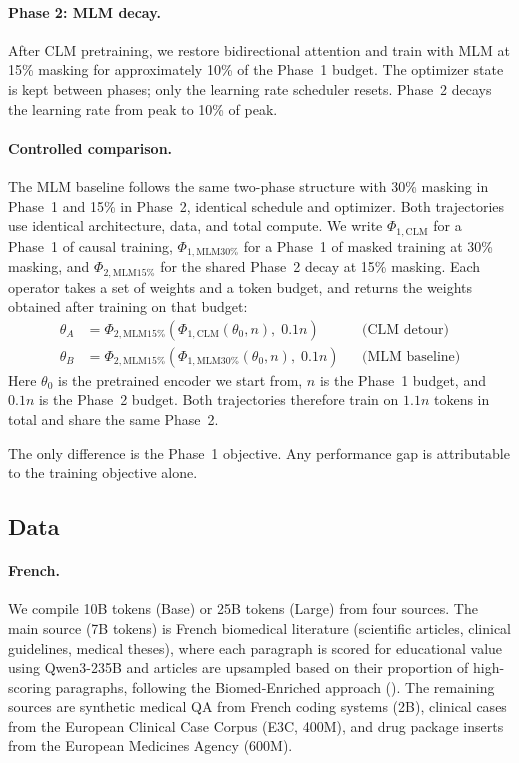 \paragraph{Phase 2: MLM decay.} After CLM pretraining, we restore bidirectional attention and train with MLM at 15\% masking for approximately 10\% of the Phase~1 budget. The optimizer state is kept between phases; only the learning rate scheduler resets. Phase~2 decays the learning rate from peak to 10\% of peak.

\paragraph{Controlled comparison.} The MLM baseline follows the same two-phase structure with 30\% masking in Phase~1 and 15\% in Phase~2, identical schedule and optimizer. Both trajectories use identical architecture, data, and total compute. We write $\Phi_{1,\text{CLM}}$ for a Phase~1 of causal training, $\Phi_{1,\text{MLM}30\%}$ for a Phase~1 of masked training at 30\% masking, and $\Phi_{2,\text{MLM}15\%}$ for the shared Phase~2 decay at 15\% masking. Each operator takes a set of weights and a token budget, and returns the weights obtained after training on that budget:
\begin{align*}
\theta_A &= \Phi_{2,\text{MLM}15\%}(\Phi_{1,\text{CLM}}(\theta_0, n),\; 0.1n) && \text{(CLM detour)} \\
\theta_B &= \Phi_{2,\text{MLM}15\%}(\Phi_{1,\text{MLM}30\%}(\theta_0, n),\; 0.1n) && \text{(MLM baseline)}
\end{align*}
Here $\theta_0$ is the pretrained encoder we start from, $n$ is the Phase~1 budget, and $0.1n$ is the Phase~2 budget. Both trajectories therefore train on $1.1n$ tokens in total and share the same Phase~2.
\begin{reviewread}
The only difference is the Phase~1 objective. Any performance gap is attributable to the training objective alone.
\end{reviewread}

\subsection{Data}

\paragraph{French.} We compile 10B tokens (Base) or 25B tokens (Large) from four sources. The main source (7B tokens) is French biomedical literature (scientific articles, clinical guidelines, medical theses), where each paragraph is scored for educational value using Qwen3-235B and articles are upsampled based on their proportion of high-scoring paragraphs, following the Biomed-Enriched approach (). The remaining sources are synthetic medical QA from French coding systems (2B), clinical cases from the European Clinical Case Corpus (E3C, 400M), and drug package inserts from the European Medicines Agency (600M).

